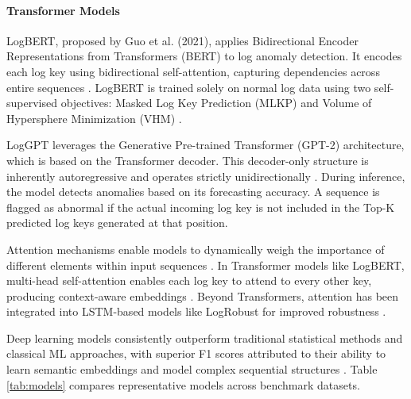 \paragraph*{Transformer Models}
LogBERT, proposed by Guo et al. (2021), applies Bidirectional Encoder Representations from Transformers (BERT) to log anomaly detection. It encodes each log key using bidirectional self-attention, capturing dependencies across entire sequences \cite{LogBERT}. LogBERT is trained solely on normal log data using two self-supervised objectives: Masked Log Key Prediction (MLKP) and Volume of Hypersphere Minimization (VHM) \cite{LogCTBL,LAnoBERT,LogBERT}.

LogGPT leverages the Generative Pre-trained Transformer (GPT-2) architecture, which is based on the Transformer decoder. This decoder-only structure is inherently autoregressive and operates strictly unidirectionally \cite{LogGPT}. During inference, the model detects anomalies based on its forecasting accuracy. A sequence is flagged as abnormal if the actual incoming log key is not included in the Top-K predicted log keys generated at that position.

Attention mechanisms enable models to dynamically weigh the importance of different elements within input sequences \cite{AttentionIsAllYouNeed}. In Transformer models like LogBERT, multi-head self-attention enables each log key to attend to every other key, producing context-aware embeddings \cite{LogBERT}. Beyond Transformers, attention has been integrated into LSTM-based models like LogRobust for improved robustness \cite{robust,LogCTBL}.

Deep learning models consistently outperform traditional statistical methods and classical ML approaches, with superior F1 scores attributed to their ability to learn semantic embeddings and model complex sequential structures \cite{almodovar-etal-2022-language}. Table \ref{tab:models} compares representative models across benchmark datasets.

